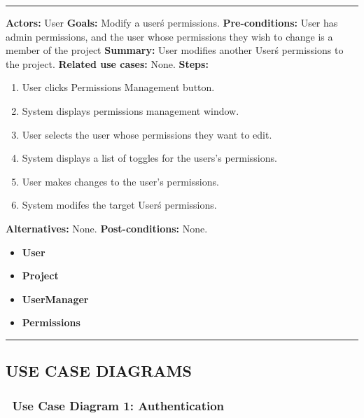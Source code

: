 \documentclass[twoside,letterpaper]{article}
\begin{document}
	\vspace{2pt}
	\hrule
	\vspace{8pt}
	 \textbf{Actors:} User \newline
	\textbf{Goals:} Modify a user\'s permissions. \newline
	 \textbf{Pre-conditions:} User has admin permissions, and the user whose permissions they wish to change is a member of the project\newline
	 \textbf{Summary:} User modifies another User\'s permissions to the project. \newline
	 \textbf{Related use cases:} None. \newline
	\textbf{Steps:} \begin{enumerate}
	  \item User clicks Permissions Management button.
	  \item System displays permissions management window.
	  \item User selects the user whose permissions they want to edit.
	  \item System displays a list of toggles for the users's permissions.
	  \item User makes changes to the user's permissions.
	  \item System modifes the target User\'s permissions.
	 \end{enumerate}
	 \textbf{Alternatives:} None. \newline
	 \textbf{Post-conditions:} None. \newline
	\begin{itemize}
		\item \textbf{User}
		\item \textbf{Project}
		\item \textbf{UserManager}
		\item \textbf{Permissions}
	\end{itemize}
	\vspace{8pt}
	\hrule
	\newpage









\subsection[USE CASE DIAGRAMS]{\rmfamily\bfseries USE CASE DIAGRAMS}


	\subsubsection[Use Case Diagram 1: Authentication]{\foreignlanguage{english}{\ Use Case Diagram 1: Authentication}}
	\label{a:ucd}
	\hypertarget{RefHeading21859017292}{}{\color{black}
	}
	
\end{document}
